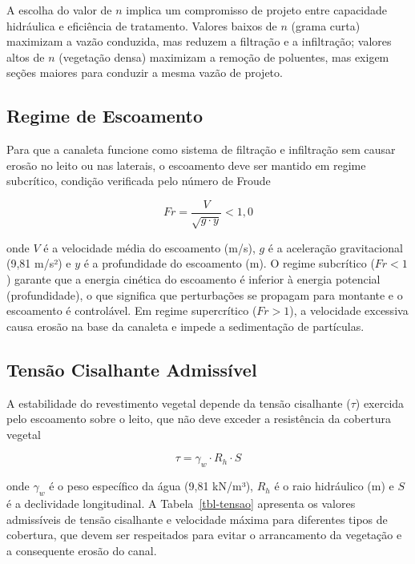 \documentclass[
  portuguese,
  11pt,
  a4paper,
  open=any]{scrbook}
\begin{document}
A escolha do valor de \(n\) implica um compromisso de projeto entre
capacidade hidráulica e eficiência de tratamento. Valores baixos de
\(n\) (grama curta) maximizam a vazão conduzida, mas reduzem a filtração
e a infiltração; valores altos de \(n\) (vegetação densa) maximizam a
remoção de poluentes, mas exigem seções maiores para conduzir a mesma
vazão de projeto.

\subsection{Regime de Escoamento}\label{regime-de-escoamento}

Para que a canaleta funcione como sistema de filtração e infiltração sem
causar erosão no leito ou nas laterais, o escoamento deve ser mantido em
regime subcrítico, condição verificada pelo número de Froude

\[
Fr = \frac{V}{\sqrt{g \cdot y}} < 1{,}0
\]

onde \(V\) é a velocidade média do escoamento (m/s), \(g\) é a
aceleração gravitacional (9,81 m/s²) e \(y\) é a profundidade do
escoamento (m). O regime subcrítico (\(Fr < 1\)) garante que a energia
cinética do escoamento é inferior à energia potencial (profundidade), o
que significa que perturbações se propagam para montante e o escoamento
é controlável. Em regime supercrítico (\(Fr > 1\)), a velocidade
excessiva causa erosão na base da canaleta e impede a sedimentação de
partículas.

\subsection{Tensão Cisalhante
Admissível}\label{tensuxe3o-cisalhante-admissuxedvel}

A estabilidade do revestimento vegetal depende da tensão cisalhante
(\(\tau\)) exercida pelo escoamento sobre o leito, que não deve exceder
a resistência da cobertura vegetal

\[
\tau = \gamma_w \cdot R_h \cdot S
\]

onde \(\gamma_w\) é o peso específico da água (9,81 kN/m³), \(R_h\) é o
raio hidráulico (m) e \(S\) é a declividade longitudinal. A
Tabela~\ref{tbl-tensao} apresenta os valores admissíveis de tensão
cisalhante e velocidade máxima para diferentes tipos de cobertura, que
devem ser respeitados para evitar o arrancamento da vegetação e a
consequente erosão do canal.
\end{document}
